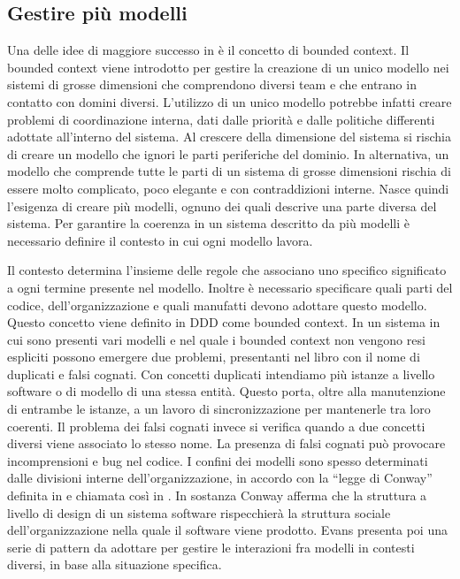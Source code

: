 \documentclass[a4paper,12pt]{report}
\begin{document}
\subsection{Gestire più modelli}   \label{bounded context}
Una delle idee di maggiore successo in \cite{evans_domain-driven_2004} è il concetto di bounded context.
Il bounded context viene introdotto per gestire la creazione di un unico modello nei sistemi di grosse dimensioni che comprendono diversi team e che entrano in contatto con domini diversi.
L'utilizzo di un unico modello potrebbe infatti creare problemi di coordinazione interna, dati dalle priorità e dalle politiche differenti adottate all'interno del sistema.
Al crescere della dimensione del sistema si rischia di creare un modello che ignori le parti periferiche del dominio. 
In alternativa, un modello che comprende tutte le parti di un sistema di grosse dimensioni rischia di essere molto complicato, poco elegante e con contraddizioni interne.
Nasce quindi l'esigenza di creare più modelli, ognuno dei quali descrive una parte diversa del sistema.
Per garantire la coerenza in un sistema descritto da più modelli è necessario definire il contesto in cui ogni modello lavora. 

Il contesto determina l'insieme delle regole che associano uno specifico significato a ogni termine presente nel modello.
Inoltre è necessario specificare quali parti del codice, dell'organizzazione e quali manufatti devono adottare questo modello.
Questo concetto viene definito in DDD come bounded context. 
In un sistema in cui sono presenti vari modelli e nel quale i bounded context non vengono resi espliciti possono emergere due problemi, presentanti nel libro con il nome di duplicati e falsi cognati.
Con concetti duplicati intendiamo più istanze a livello software o di modello di una stessa entità.
Questo porta, oltre alla manutenzione di entrambe le istanze, a un lavoro di sincronizzazione per mantenerle tra loro coerenti.
Il problema dei falsi cognati invece si verifica quando a due concetti diversi viene associato lo stesso nome.
La presenza di falsi cognati può provocare incomprensioni e bug nel codice.    
I confini dei modelli sono spesso determinati dalle divisioni interne dell'organizzazione, in accordo con la ``legge di Conway'' definita in \cite{conway_how_1968} e chiamata così in \cite{brooks_jr_mythical_1974}.
In sostanza Conway afferma che la struttura a livello di design di un sistema software rispecchierà la struttura sociale dell'organizzazione nella quale il software viene prodotto.
Evans presenta poi una serie di pattern da adottare per gestire le interazioni fra modelli in contesti diversi, in base alla situazione specifica.
\end{document}
